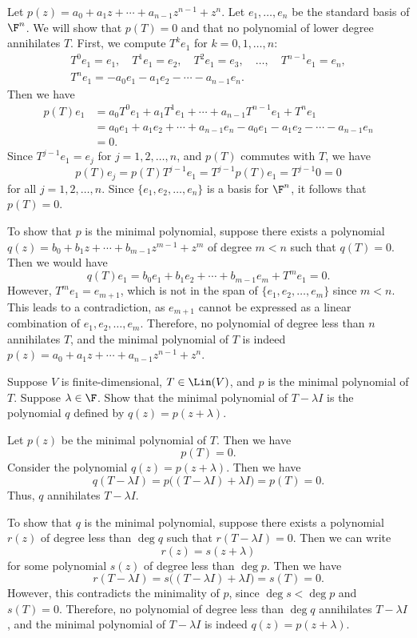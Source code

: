 \begin{solution}
Let $p(z)=a_0+a_1z+\cdots+a_{n-1}z^{n-1}+z^n$. Let $e_1,\dots,e_n$ be the
standard basis of $\F^n$. We will show that $p(T)=0$ and that no polynomial of
lower degree annihilates $T$. First, we compute $T^ke_1$ for $k=0,1,\dots,n$:
\begin{gather*}
T^0e_1=e_1,\quad T^1e_1=e_2,\quad T^2e_1=e_3,\quad\dots,\quad
T^{n-1}e_1=e_n,\\
T^ne_1=-a_0e_1-a_1e_2-\cdots-a_{n-1}e_n.
\end{gather*}
Then we have
\begin{align*}
p(T)e_1 &= a_0T^0e_1+a_1T^1e_1+\cdots+a_{n-1}T^{n-1}e_1+T^ne_1\\
        &= a_0e_1+a_1e_2+\cdots+a_{n-1}e_n-a_0e_1-a_1e_2-\cdots-a_{n-1}e_n\\
        &= 0.
\end{align*}
Since $T^{j-1}e_1=e_j$ for $j=1,2,\dots,n$, and $p(T)$ commutes with $T$, we
have
\[ p(T)e_j=p(T)T^{j-1}e_1=T^{j-1}p(T)e_1=T^{j-1}0=0 \]
for all $j=1,2,\dots,n$. Since $\{e_1,e_2,\dots,e_n\}$ is a basis for $\F^n$,
it follows that $p(T)=0$.

To show that $p$ is the minimal polynomial, suppose there exists a polynomial
$q(z)=b_0+b_1z+\cdots+b_{m-1}z^{m-1}+z^m$ of degree $m<n$ such that $q(T)=0$.
Then we would have
\[ q(T)e_1=b_0e_1+b_1e_2+\cdots+b_{m-1}e_m+T^me_1=0. \]
However, $T^me_1=e_{m+1}$, which is not in the span of $\{e_1,e_2,\dots,e_m\}$
since $m<n$. This leads to a contradiction, as $e_{m+1}$ cannot be expressed
as a linear combination of $e_1,e_2,\dots,e_m$. Therefore, no polynomial of
degree less than $n$ annihilates $T$, and the minimal polynomial of $T$ is
indeed $p(z)=a_0+a_1z+\cdots+a_{n-1}z^{n-1}+z^n$.
\end{solution}

\begin{exercise}
Suppose $V$ is finite-dimensional, $T\in\Lin(V)$, and $p$ is the minimal
polynomial of $T$. Suppose $\lambda\in\F$. Show that the minimal polynomial of
$T-\lambda I$ is the polynomial $q$ defined by $q(z)=p(z+\lambda)$.
\end{exercise}
\begin{solution}
Let $p(z)$ be the minimal polynomial of $T$. Then we have
\[ p(T)=0. \]
Consider the polynomial $q(z)=p(z+\lambda)$. Then we have
\[ q(T-\lambda I)=p\bigl((T-\lambda I)+\lambda I\bigr)=p(T)=0. \]
Thus, $q$ annihilates $T-\lambda I$.

To show that $q$ is the minimal polynomial, suppose there exists a polynomial
$r(z)$ of degree less than $\deg q$ such that $r(T-\lambda I)=0$. Then we can
write
\[ r(z)=s(z+\lambda) \]
for some polynomial $s(z)$ of degree less than $\deg p$. Then we have
\[ r(T-\lambda I)=s\bigl((T-\lambda I)+\lambda I\bigr)=s(T)=0. \]
However, this contradicts the minimality of $p$, since $\deg s<\deg p$ and
$s(T)=0$. Therefore, no polynomial of degree less than $\deg q$ annihilates
$T-\lambda I$, and the minimal polynomial of $T-\lambda I$ is indeed
$q(z)=p(z+\lambda)$.
\end{solution}


